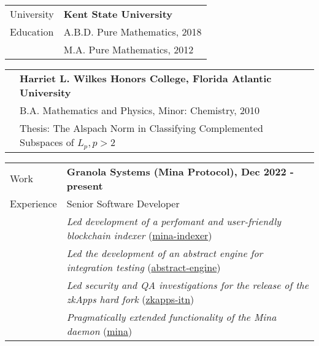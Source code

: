 \documentclass[letterpaper,10pt,oneside]{article}
\begin{document}
\vspace{0.1in}



\noindent \begin{tabular}{@{} l l}
 \Large{University} & \textbf{Kent State University} \\
 \Large{Education} & A.B.D. Pure Mathematics, 2018 \\
 \hspace{1.1in} & M.A. Pure Mathematics, 2012 \\
\end{tabular}

\vfill


\noindent \begin{tabular}{@{} l l}
 \hspace{1.1in} & \textbf{Harriet L. Wilkes Honors College, Florida Atlantic University} \\
 & B.A. Mathematics and Physics, Minor: Chemistry, 2010 \\
 & Thesis: The Alspach Norm in Classifying Complemented Subspaces of $L_p, p>2$ \\
\end{tabular}

\vfill



\noindent \begin{tabular}{@{} l l}
 \Large{Work} & \textbf{Granola Systems (Mina Protocol), Dec 2022 - present} \\
 \Large{Experience} & Senior Software Developer \\
 \hspace{1.1in} & \emph{Led development of a perfomant and user-friendly blockchain indexer} (\href{https://github.com/Granola-Team/mina-indexer}{mina-indexer}) \\
 & \emph{Led the development of an abstract engine for integration testing} (\href{https://github.com/MinaFoundation/mina/tree/abstract_engine}{abstract-engine}) \\
 & \emph{Led security and QA investigations for the release of the zkApps hard fork} (\href{https://github.com/Granola-Team/zkapps-itn}{zkapps-itn}) \\
 & \emph{Pragmatically extended functionality of the Mina daemon} (\href{https://github.com/MinaProtocol/mina/pull/13258}{mina})
\end{tabular}
\end{document}
